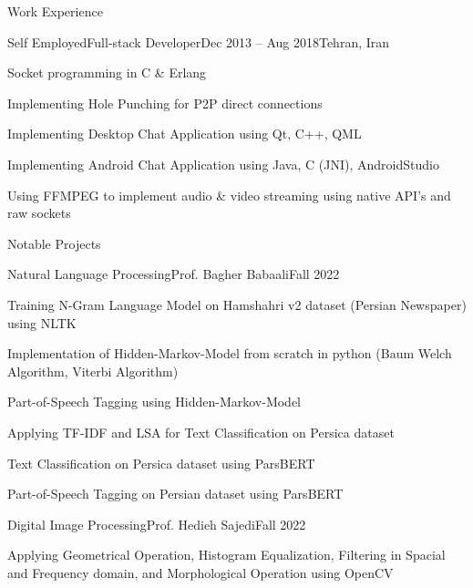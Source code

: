 \documentclass[]{main}
\begin{document}
\begin{section}{Work Experience}
\begin{subsection}{Self Employed}{Full-stack Developer}{Dec 2013 -- Aug 2018}{Tehran, Iran}
        \item Socket programming in C \& Erlang 
        \item Implementing Hole Punching for P2P direct connections 
        \item Implementing Desktop Chat Application using Qt, C++, QML 
        \item Implementing Android Chat Application using Java, C (JNI), AndroidStudio 
        \item Using FFMPEG to implement audio \& video streaming using native API's and raw sockets 
        \end{subsection}

\end{section}

\begin{section}{Notable Projects}
    \begin{subsection}{Natural Language Processing}{Prof. Bagher Babaali}{Fall 2022}{}
        \item Training N-Gram Language Model on Hamshahri v2 dataset (Persian Newspaper) using NLTK \;\href{https://github.com/ckoliber/nlpexercises/blob/main/src/exercise1.ipynb}{\faExternalLink*}
        \item Implementation of Hidden-Markov-Model from scratch in python (Baum Welch Algorithm, Viterbi Algorithm) \;\href{https://github.com/ckoliber/nlpexercises/blob/main/src/hmm/hmm.py}{\faExternalLink*}
        \item Part-of-Speech Tagging using Hidden-Markov-Model \;\href{https://github.com/ckoliber/nlpexercises/blob/main/src/exercise3.ipynb}{\faExternalLink*}
        \item Applying TF-IDF and LSA for Text Classification on Persica dataset \;\href{https://github.com/ckoliber/nlpexercises/blob/main/src/exercise4.ipynb}{\faExternalLink*}
        \item Text Classification on Persica dataset using ParsBERT \;\href{https://github.com/ckoliber/nlpexercises/blob/main/src/exercise5.ipynb}{\faExternalLink*}
        \item Part-of-Speech Tagging on Persian dataset using ParsBERT \;\href{https://github.com/ckoliber/nlpexercises/blob/main/src/exercise6.ipynb}{\faExternalLink*}
        \end{subsection}
\begin{subsection}{Digital Image Processing}{Prof. Hedieh Sajedi}{Fall 2022}{}
        \item Applying Geometrical Operation, Histogram Equalization, Filtering in Spacial and Frequency domain, and Morphological Operation using OpenCV \;\href{https://github.com/ckoliber/dipexercises/blob/main/src/exercise1.ipynb}{\faExternalLink*}

\end{subsection}
\end{section}
\end{document}
